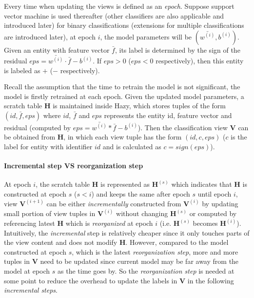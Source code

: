 Every time when updating the views is defined as an {\em epoch}. Suppose support vector machine is used thereafter (other classifiers are also applicable and introduced later) for binary classifications (extensions for multiple classifications are introduced later), at epoch $i$, the model parameters will be $(\bar{w^{(i)}}, b^{(i)})$. Given an entity with feature vector $\bar{f}$, its label is determined by the sign of the residual $eps = \bar{w^{(i)}}\cdot\bar{f}-b^{(i)}$. If $eps > 0$ ($eps < 0$ respectively), then this entity is labeled as $+$ ($-$ respectively).

Recall the assumption that the time to retrain the model is not significant, the model is firstly retrained at each epoch. Given the updated model parameters, a scratch table $\textbf{H}$ is maintained inside Hazy, which stores tuples of the form $(id, \bar{f}, eps)$ where $id$, $\bar{f}$ and $eps$ represents the entity id, feature vector and residual (computed by $eps = \bar{w^{(i)}}*\bar{f}-b^{(i)}$). Then the classification view $\textbf{V}$ can be obtained from $\textbf{H}$, in which each view tuple has the form $(id, c, eps)$ ($c$ is the label for entity with identifier $id$ and is calculated as $c=sign(eps)$). 

\paragraph{Incremental step VS reorganization step} At epoch $i$, the scratch table $\textbf{H}$ is represented as $\textbf{H}^{(s)}$ which indicates that $\textbf{H}$ is constructed at epoch $s$ ($s < i$) and keeps the same after epoch $s$ until epoch $i$, view $\textbf{V}^{(i+1)}$ can be either {\em incrementally} constructed from $\textbf{V}^{(i)}$ by updating small portion of view tuples in $\textbf{V}^{(i)}$ without changing $\textbf{H}^{(s)}$ or computed by referencing latest $\textbf{H}$ which is {\em reorganized} at epoch $i$ (i.e. $\textbf{H}^{(s)}$ becomes $\textbf{H}^{(i)}$). Intuitively, the {\em incremental} step is relatively cheaper since it only touches parts of the view content and does not modify $\textbf{H}$. However, compared to the model constructed at epoch $s$, which is the latest {\em reorganization step}, more and more tuples in $\textbf{V}$ need to be updated since current model may be far away from the model at epoch $s$ as the time goes by. So the {\em reorganization step} is needed at some point to reduce the overhead to update the labels in $\textbf{V}$ in the following {\em incremental steps}.

